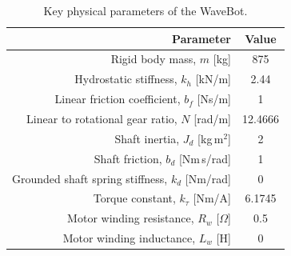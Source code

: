\documentclass[lettersize,journal]{IEEEtran}
\begin{document}
\begin{table}[tb]
        \caption{Key physical parameters of the WaveBot.}
        \label{tab:wec_physical_params}
        \centering

        \begin{tabular}{rc}
        \hline

        \hline
        \textbf{Parameter} & \textbf{Value} \\
        \hline
        Rigid body mass, $m$ [kg]                       & 875 \\
        Hydrostatic stiffness, $k_h$ [kN/m]             & 2.44 \\
        Linear friction coefficient, $b_f$ [Ns/m]       & 1 \\ %
        Linear to rotational gear ratio, $N$ [rad/m]    & 12.4666 \\
        Shaft inertia, $J_d$ [kg\,m$^2$]                & 2 \\ %
        Shaft friction, $b_d$ [Nm\,s/rad]               & 1 \\ %
        Grounded shaft spring stiffness, $k_d$ [Nm/rad] & 0 \\ %
        Torque constant, $k_\tau$ [Nm/A]                & 6.1745 \\
        Motor winding resistance, $R_w$ [$\Omega$]      & 0.5 \\
        Motor winding inductance, $L_w$ [H]             & 0 \\
        \hline

        \hline
        \end{tabular}
\end{table}

\end{document}
